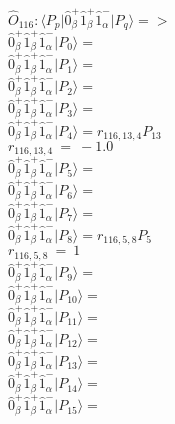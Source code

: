 \documentclass[14pt]{article}
\begin{document}
    $\hat{O}_{116}:  \langle{P_p}\vert \hat{0}_{\beta}^{+}\hat{1}_{\beta}^{+}\hat{1}_{\alpha}^{-} \vert{P_q}\rangle => $ \\ 
    $ \hat{0}_{\beta}^{+}\hat{1}_{\beta}^{+}\hat{1}_{\alpha}^{-} \vert{P_{0}}\rangle =  $ \\ 
    $ \hat{0}_{\beta}^{+}\hat{1}_{\beta}^{+}\hat{1}_{\alpha}^{-} \vert{P_{1}}\rangle =  $ \\ 
    $ \hat{0}_{\beta}^{+}\hat{1}_{\beta}^{+}\hat{1}_{\alpha}^{-} \vert{P_{2}}\rangle =  $ \\ 
    $ \hat{0}_{\beta}^{+}\hat{1}_{\beta}^{+}\hat{1}_{\alpha}^{-} \vert{P_{3}}\rangle =  $ \\ 
    $ \hat{0}_{\beta}^{+}\hat{1}_{\beta}^{+}\hat{1}_{\alpha}^{-} \vert{P_{4}}\rangle = {r}_{116,13,4}P_{13} $ \\ 
    ${r}_{116,13,4}\ =\ -1.0 $ \\ 
    $ \hat{0}_{\beta}^{+}\hat{1}_{\beta}^{+}\hat{1}_{\alpha}^{-} \vert{P_{5}}\rangle =  $ \\ 
    $ \hat{0}_{\beta}^{+}\hat{1}_{\beta}^{+}\hat{1}_{\alpha}^{-} \vert{P_{6}}\rangle =  $ \\ 
    $ \hat{0}_{\beta}^{+}\hat{1}_{\beta}^{+}\hat{1}_{\alpha}^{-} \vert{P_{7}}\rangle =  $ \\ 
    $ \hat{0}_{\beta}^{+}\hat{1}_{\beta}^{+}\hat{1}_{\alpha}^{-} \vert{P_{8}}\rangle = {r}_{116,5,8}P_{5} $ \\ 
    ${r}_{116,5,8}\ =\ 1 $ \\ 
    $ \hat{0}_{\beta}^{+}\hat{1}_{\beta}^{+}\hat{1}_{\alpha}^{-} \vert{P_{9}}\rangle =  $ \\ 
    $ \hat{0}_{\beta}^{+}\hat{1}_{\beta}^{+}\hat{1}_{\alpha}^{-} \vert{P_{10}}\rangle =  $ \\ 
    $ \hat{0}_{\beta}^{+}\hat{1}_{\beta}^{+}\hat{1}_{\alpha}^{-} \vert{P_{11}}\rangle =  $ \\ 
    $ \hat{0}_{\beta}^{+}\hat{1}_{\beta}^{+}\hat{1}_{\alpha}^{-} \vert{P_{12}}\rangle =  $ \\ 
    $ \hat{0}_{\beta}^{+}\hat{1}_{\beta}^{+}\hat{1}_{\alpha}^{-} \vert{P_{13}}\rangle =  $ \\ 
    $ \hat{0}_{\beta}^{+}\hat{1}_{\beta}^{+}\hat{1}_{\alpha}^{-} \vert{P_{14}}\rangle =  $ \\ 
    $ \hat{0}_{\beta}^{+}\hat{1}_{\beta}^{+}\hat{1}_{\alpha}^{-} \vert{P_{15}}\rangle =  $ \\ 
    
\end{document}
